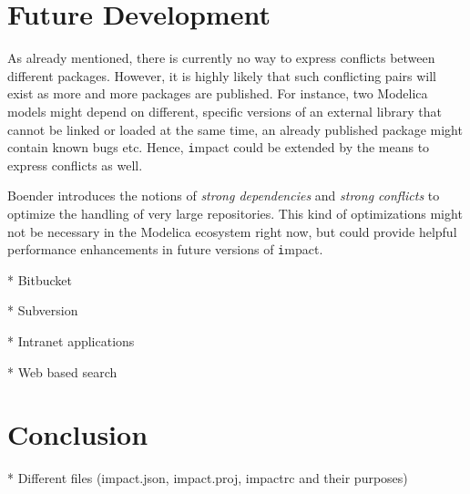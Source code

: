 \documentclass[11pt,a4paper,twocolumn]{article}
\renewcommand{\normalsize}{\fontsize{10.5pt}{12.3pt}\selectfont}
\renewcommand{\small}{\fontsize{9.5pt}{11.1pt}\selectfont}
\newcommand{\code}[1]{\texttt{#1}} %
\begin{document}
\section{Future Development}

As already mentioned, there is currently no way to express conflicts
between different packages.  However, it is highly likely that such
conflicting pairs will exist as more and more packages are published.
For instance, two Modelica models might depend on different, specific
versions of an external library that cannot be linked or loaded at the
same time, an already published package might contain known bugs etc.
Hence, {\code impact} could be extended by the means to express
conflicts as well.

Boender introduces the notions of {\em strong dependencies} and {\em
  strong conflicts} to optimize the handling of very large
repositories.  This kind of optimizations might not be necessary in
the Modelica ecosystem right now, but could provide helpful
performance enhancements in future versions of {\code impact}.

* Bitbucket

* Subversion

* Intranet applications

* Web based search

\section{Conclusion}

* Different files (impact.json, impact.proj, impactrc and their purposes)


\small


\normalsize
\end{document}
